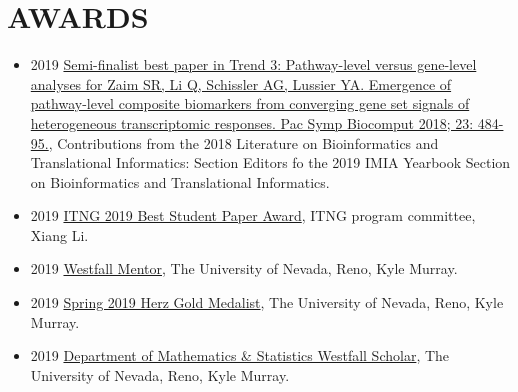 \documentclass[paper=a4,fontsize=11pt]{scrartcl} %
\newcommand{\NewPart}[2]{\section*{\uppercase{#1} #2 }}
\begin{document}

\NewPart{Awards}{}
\vspace{-7pt}

\begin{itemize}[noitemsep]
   \item 2019 \href{https://www.thieme-connect.com/products/ejournals/html/10.1055/s-0039-1677945#N67545}{Semi-finalist best paper in Trend 3: Pathway-level versus gene-level analyses for Zaim SR, Li Q, Schissler AG, Lussier YA. Emergence of pathway-level composite biomarkers from converging gene set signals of heterogeneous transcriptomic responses. Pac Symp Biocomput 2018; 23: 484-95.}, Contributions from the 2018 Literature on Bioinformatics and Translational Informatics: Section Editors fo the 2019 IMIA Yearbook Section on Bioinformatics and Translational Informatics.
    \item 2019 \href{https://http://www.itng.info/}{ITNG 2019 Best Student Paper Award}, ITNG program committee, Xiang Li.
    \item 2019 \href{https://www.unr.edu/science/student-resources/student-competitions-awards}{Westfall Mentor}, The University of Nevada, Reno, Kyle Murray.
\item 2019 \href{https://www.unr.edu/nevada-today/news/2019/spring-2019-herz-gold-medalist?utm_source=newsletter051619&utm_medium=email&utm_content=kylemurray&utm_campaign=NevadaWeekly}{Spring 2019 Herz Gold Medalist}, The University of Nevada, Reno, Kyle Murray.
  \item 2019 \href{https://www.unr.edu/science/student-resources/student-competitions-awards}{Department of Mathematics \& Statistics Westfall Scholar}, The University of Nevada, Reno, Kyle Murray.

\vspace{-7pt}
\end{itemize}  
\end{document}
